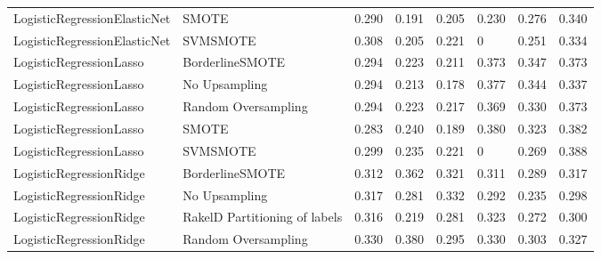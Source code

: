 \begin{tabular}{llllllll}
   LogisticRegressionElasticNet &                         SMOTE & 0.290 &                     0.191 &                 0.205 &                  0.230 &                                   0.276 &     0.340 \\
   LogisticRegressionElasticNet &                      SVMSMOTE & 0.308 &                     0.205 &                 0.221 &                      0 &                                   0.251 &     0.334 \\
        LogisticRegressionLasso &               BorderlineSMOTE & 0.294 &                     0.223 &                 0.211 &                  0.373 &                                   0.347 &     0.373 \\
        LogisticRegressionLasso &                 No Upsampling & 0.294 &                     0.213 &                 0.178 &                  0.377 &                                   0.344 &     0.337 \\
        LogisticRegressionLasso &           Random Oversampling & 0.294 &                     0.223 &                 0.217 &                  0.369 &                                   0.330 &     0.373 \\
        LogisticRegressionLasso &                         SMOTE & 0.283 &                     0.240 &                 0.189 &                  0.380 &                                   0.323 &     0.382 \\
        LogisticRegressionLasso &                      SVMSMOTE & 0.299 &                     0.235 &                 0.221 &                      0 &                                   0.269 &     0.388 \\
        LogisticRegressionRidge &               BorderlineSMOTE & 0.312 &                     0.362 &                 0.321 &                  0.311 &                                   0.289 &     0.317 \\
        LogisticRegressionRidge &                 No Upsampling & 0.317 &                     0.281 &                 0.332 &                  0.292 &                                   0.235 &     0.298 \\
        LogisticRegressionRidge & RakelD Partitioning of labels & 0.316 &                     0.219 &                 0.281 &                  0.323 &                                   0.272 &     0.300 \\
        LogisticRegressionRidge &           Random Oversampling & 0.330 &                     0.380 &                 0.295 &                  0.330 &                                   0.303 &     0.327 \\

\end{tabular}
